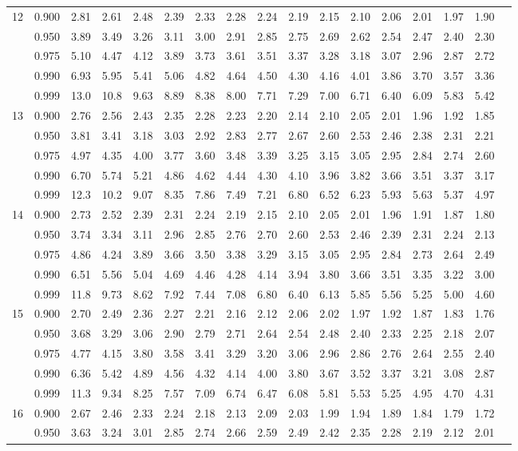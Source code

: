 {\begin{center}
\begin{tabular}{rrr@{\,}r@{\,}r@{\,}r@{\,}r@{\,}r@{\,}r@{\,}r
                   @{\,}r@{\,}r@{\,}r@{\,}r@{\,}r@{\,}r@{\,}r}
12&0.900&2.81&2.61&2.48&2.39&2.33&2.28&2.24&2.19&2.15&2.10&2.06&2.01&1.97&1.90\\
  &0.950&3.89&3.49&3.26&3.11&3.00&2.91&2.85&2.75&2.69&2.62&2.54&2.47&2.40&2.30\\
  &0.975&5.10&4.47&4.12&3.89&3.73&3.61&3.51&3.37&3.28&3.18&3.07&2.96&2.87&2.72\\
  &0.990&6.93&5.95&5.41&5.06&4.82&4.64&4.50&4.30&4.16&4.01&3.86&3.70&3.57&3.36\\
  &0.999&13.0&10.8&9.63&8.89&8.38&8.00&7.71&7.29&7.00&6.71&6.40&6.09&5.83&5.42\\
13&0.900&2.76&2.56&2.43&2.35&2.28&2.23&2.20&2.14&2.10&2.05&2.01&1.96&1.92&1.85\\
  &0.950&3.81&3.41&3.18&3.03&2.92&2.83&2.77&2.67&2.60&2.53&2.46&2.38&2.31&2.21\\
  &0.975&4.97&4.35&4.00&3.77&3.60&3.48&3.39&3.25&3.15&3.05&2.95&2.84&2.74&2.60\\
  &0.990&6.70&5.74&5.21&4.86&4.62&4.44&4.30&4.10&3.96&3.82&3.66&3.51&3.37&3.17\\
  &0.999&12.3&10.2&9.07&8.35&7.86&7.49&7.21&6.80&6.52&6.23&5.93&5.63&5.37&4.97\\
14&0.900&2.73&2.52&2.39&2.31&2.24&2.19&2.15&2.10&2.05&2.01&1.96&1.91&1.87&1.80\\
  &0.950&3.74&3.34&3.11&2.96&2.85&2.76&2.70&2.60&2.53&2.46&2.39&2.31&2.24&2.13\\
  &0.975&4.86&4.24&3.89&3.66&3.50&3.38&3.29&3.15&3.05&2.95&2.84&2.73&2.64&2.49\\
  &0.990&6.51&5.56&5.04&4.69&4.46&4.28&4.14&3.94&3.80&3.66&3.51&3.35&3.22&3.00\\
  &0.999&11.8&9.73&8.62&7.92&7.44&7.08&6.80&6.40&6.13&5.85&5.56&5.25&5.00&4.60\\
15&0.900&2.70&2.49&2.36&2.27&2.21&2.16&2.12&2.06&2.02&1.97&1.92&1.87&1.83&1.76\\
  &0.950&3.68&3.29&3.06&2.90&2.79&2.71&2.64&2.54&2.48&2.40&2.33&2.25&2.18&2.07\\
  &0.975&4.77&4.15&3.80&3.58&3.41&3.29&3.20&3.06&2.96&2.86&2.76&2.64&2.55&2.40\\
  &0.990&6.36&5.42&4.89&4.56&4.32&4.14&4.00&3.80&3.67&3.52&3.37&3.21&3.08&2.87\\
  &0.999&11.3&9.34&8.25&7.57&7.09&6.74&6.47&6.08&5.81&5.53&5.25&4.95&4.70&4.31\\
16&0.900&2.67&2.46&2.33&2.24&2.18&2.13&2.09&2.03&1.99&1.94&1.89&1.84&1.79&1.72\\
  &0.950&3.63&3.24&3.01&2.85&2.74&2.66&2.59&2.49&2.42&2.35&2.28&2.19&2.12&2.01\\

\end{tabular}
\end{center}}
